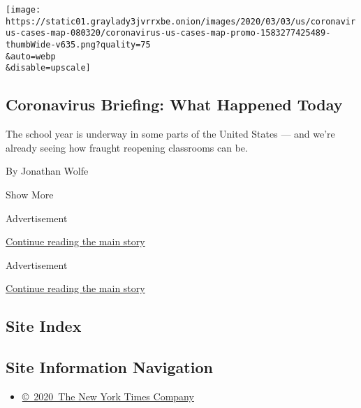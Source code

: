 \begin{enumerate}
  \texttt{[image: https://static01.graylady3jvrrxbe.onion/images/2020/03/03/us/coronavirus-cases-map-080320/coronavirus-us-cases-map-promo-1583277425489-thumbWide-v635.png?quality=75\\\&auto=webp\\\&disable=upscale]}

  \hypertarget{coronavirus-briefing-what-happened-today}{%
  \subsection{Coronavirus Briefing: What Happened
  Today}\label{coronavirus-briefing-what-happened-today}}

  The school year is underway in some parts of the United States --- and
  we're already seeing how fraught reopening classrooms can be.

  By Jonathan Wolfe
\end{enumerate}

Show More

Advertisement

\protect\hyperlink{after-mid2}{Continue reading the main story}

Advertisement

\protect\hyperlink{after-mktg}{Continue reading the main story}

\hypertarget{site-index}{%
\subsection{Site Index}\label{site-index}}

\hypertarget{site-information-navigation}{%
\subsection{Site Information
Navigation}\label{site-information-navigation}}

\begin{itemize}
\tightlist
\item
  \href{https://help.nytimes3xbfgragh.onion/hc/en-us/articles/115014792127-Copyright-notice}{©~2020~The
  New York Times Company}
\end{itemize}

